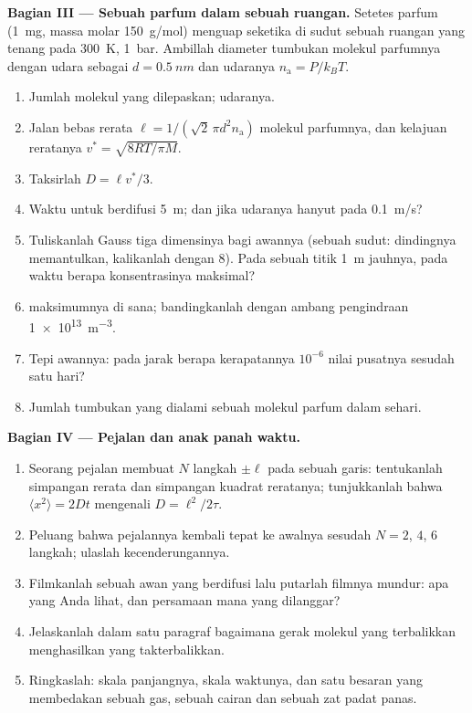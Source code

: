 \begin{problem}
\textbf{Bagian III --- Sebuah parfum dalam sebuah ruangan.}
Setetes parfum (\qty{1}{mg}, massa molar \qty{150}{g/mol}) menguap
seketika di sudut sebuah ruangan yang tenang pada \qty{300}{K}, \qty{1}{bar}.
Ambillah diameter tumbukan molekul parfumnya dengan udara sebagai $d =
\qty{0.5}{nm}$ dan  udaranya $n_{\text{a}} = P/k_BT$.
\begin{enumerate}[resume]
  \item Jumlah molekul yang dilepaskan;  udaranya.
  \item Jalan bebas rerata $\ell = 1/(\sqrt2\,\pi d^2 n_{\text{a}})$ molekul
        parfumnya, dan kelajuan reratanya $v^* = \sqrt{8RT/\pi M}$.
  \item Taksirlah $D = \ell v^*/3$.
  \item Waktu untuk berdifusi \qty{5}{m}; dan jika udaranya hanyut pada
        \qty{0.1}{m/s}?
  \item Tuliskanlah Gauss tiga dimensinya bagi awannya (sebuah sudut:
        dindingnya memantulkan, kalikanlah dengan $8$). Pada sebuah titik \qty{1}{m} jauhnya,
        pada waktu berapa konsentrasinya maksimal?
  \item {} maksimumnya di sana; bandingkanlah dengan ambang
        pengindraan \qty{1e13}{m^{-3}}.
  \item Tepi awannya: pada jarak berapa kerapatannya $10^{-6}$
        nilai pusatnya sesudah satu hari?
  \item Jumlah tumbukan yang dialami sebuah molekul parfum dalam sehari.
\end{enumerate}

\textbf{Bagian IV --- Pejalan dan anak panah waktu.}
\begin{enumerate}[resume]
  \item Seorang pejalan membuat $N$ langkah $\pm\ell$ pada sebuah garis: tentukanlah simpangan
        rerata dan simpangan kuadrat reratanya; tunjukkanlah bahwa $\langle x^2\rangle = 2Dt$
        mengenali $D = \ell^2/2\tau$.
  \item Peluang bahwa pejalannya kembali tepat ke awalnya sesudah
        $N = 2$, $4$, $6$ langkah; ulaslah kecenderungannya.
  \item Filmkanlah sebuah awan yang berdifusi lalu putarlah filmnya mundur: apa yang Anda
        lihat, dan persamaan mana yang dilanggar?
  \item Jelaskanlah dalam satu paragraf bagaimana gerak molekul yang terbalikkan
        menghasilkan  yang takterbalikkan.
  \item Ringkaslah: skala panjangnya, skala waktunya, dan satu
        besaran yang membedakan sebuah gas, sebuah cairan dan sebuah zat padat panas.
\end{enumerate}
\end{problem}
